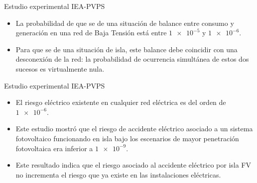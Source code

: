 \documentclass[aspectratio=169, usenames,svgnames,dvipsnames]{beamer}
\begin{document}
\begin{frame}[label={sec:org06e36f5}]{Estudio experimental IEA-PVPS}
\begin{itemize}
\item La probabilidad de que se de una situación de balance entre consumo y
generación en una red de Baja Tensión está entre \(\num{1e-5}\) y
\(\num{1e-6}\).

\item Para que se de una situación de isla, este balance debe coincidir con
una desconexión de la red: la probabilidad de ocurrencia simultánea
de estos dos sucesos es virtualmente nula.
\end{itemize}
\end{frame}

\begin{frame}[label={sec:org1178d31}]{Estudio experimental IEA-PVPS}
\begin{itemize}
\item El riesgo eléctrico existente en cualquier red eléctrica es del orden
de \(\num{1e-6}\).

\item Este estudio mostró que el riesgo de accidente eléctrico asociado a
un sistema fotovoltaico funcionando en isla bajo los escenarios de
mayor penetración fotovoltaica era inferior a \(\num{1e-9}\).

\item Este resultado indica que el riesgo asociado al accidente eléctrico
por isla FV no incrementa el riesgo que ya existe en las
instalaciones eléctricas.
\end{itemize}
\end{frame}
\end{document}
